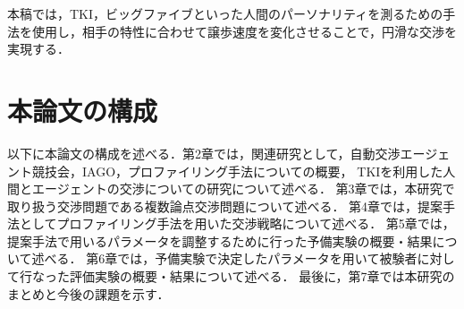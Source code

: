 本稿では，TKI，ビッグファイブといった人間のパーソナリティを測るための手法を使用し，相手の特性に合わせて譲歩速度を変化させることで，円滑な交渉を実現する．

\section{本論文の構成}
以下に本論文の構成を述べる．第2章では，関連研究として，自動交渉エージェント競技会，IAGO，プロファイリング手法についての概要，
TKIを利用した人間とエージェントの交渉についての研究について述べる．
第3章では，本研究で取り扱う交渉問題である複数論点交渉問題について述べる．
第4章では，提案手法としてプロファイリング手法を用いた交渉戦略について述べる．
第5章では，提案手法で用いるパラメータを調整するために行った予備実験の概要・結果について述べる．
第6章では，予備実験で決定したパラメータを用いて被験者に対して行なった評価実験の概要・結果について述べる．
最後に，第7章では本研究のまとめと今後の課題を示す．

